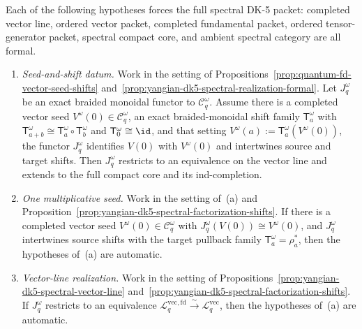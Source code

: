 \begin{corollary}
\label{cor:yangian-dk5-spectral-seed-realization}%
\label{cor:yangian-dk5-spectral-one-seed}%
\label{cor:yangian-dk5-spectral-factorization-vector-line}%
\label{cor:yangian-dk5-spectral-factorization-ambient-vector-line}%
Each of the following hypotheses forces the full spectral DK-5 packet:
completed vector line, ordered vector packet, completed fundamental
packet, ordered tensor-generator packet, spectral compact core, and
ambient spectral category are all formal.
\begin{enumerate}[label=\textup{(\alph*)}]
\item\emph{Seed-and-shift datum.}
 Work in the setting of
 Propositions~\ref{prop:quantum-fd-vector-seed-shifts}
 and~\ref{prop:yangian-dk5-spectral-realization-formal}. Let
 \(J_q^\omega\) be an exact braided monoidal functor to
 \(\mathcal{C}_q^\omega\). Assume there is a completed vector seed
 \(V^\omega(0)\in \mathcal{C}_q^\omega\), an exact braided-monoidal
 shift family \(\mathsf{T}_a^\omega\) with
 \(\mathsf{T}_{a+b}^\omega\cong
 \mathsf{T}_a^\omega\circ \mathsf{T}_b^\omega\) and
 \(\mathsf{T}_0^\omega\cong \id\), and that setting
 \(V^\omega(a):=\mathsf{T}_a^\omega(V^\omega(0))\), the functor
 \(J_q^\omega\) identifies \(V(0)\) with \(V^\omega(0)\) and
 intertwines source and target shifts. Then \(J_q^\omega\) restricts
 to an equivalence on the vector line and extends to the full compact
 core and its ind-completion.

\item\emph{One multiplicative seed.}
 Work in the setting of~\textup{(a)} and
 Proposition~\ref{prop:yangian-dk5-spectral-factorization-shifts}.
 If there is a completed vector seed
 \(V^\omega(0)\in \mathcal C_q^\omega\) with
 \(J_q^\omega(V(0))\cong V^\omega(0)\), and \(J_q^\omega\)
 intertwines source shifts with the target pullback family
 \(\mathsf T_a^\omega=\rho_a^*\), then the hypotheses
 of~\textup{(a)} are automatic.

\item\emph{Vector-line realization.}
 Work in the setting of
 Propositions~\ref{prop:yangian-dk5-spectral-vector-line}
 and~\ref{prop:yangian-dk5-spectral-factorization-shifts}.
 If \(J_q^\omega\) restricts to an equivalence
 \(\mathcal L_q^{\mathrm{vec,fd}}
 \xrightarrow{\sim}
 \mathcal L_q^{\mathrm{vec}}\),
 then the hypotheses of~\textup{(a)} are automatic.


\end{enumerate}
\end{corollary}
